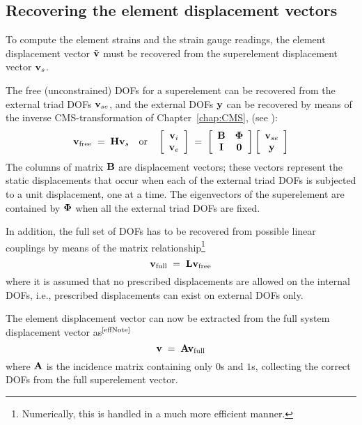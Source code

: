 \subsection{Recovering the element displacement vectors}

To compute the element strains and the strain gauge readings,
the element displacement vector $\tilde{\bf v}$ must be recovered from the
superelement displacement vector ${\bf v}_s$.

The free (unconstrained) DOFs for a superelement can be recovered from the
external triad DOFs ${\bf v}_{se}$, and the external DOFs ${\bf y}$ can be
recovered by means of the inverse CMS-transformation of Chapter~\ref{chap:CMS},
(see ):
%
\begin{equation}
{\bf v}_{\text{free}} \;=\; {\bf H v}_s \quad\text{or}\quad
\left[\begin{array}{c} {\bf v}_i \\ {\bf v}_e \end{array}\right] \;=\;
\left[\begin{array}{cc} {\bf B} & {\boldsymbol{\Phi}} \\ {\bf I} & {\bf 0}
\end{array}\right]
\left[\begin{array}{c} {\bf v}_{se} \\ {\bf y}
\end{array}\right]
\end{equation}
%
The columns of matrix $\bf B$ are displacement vectors; these vectors represent
the static displacements that occur when each of the external triad DOFs is
subjected to a unit displacement, one at a time.
The eigenvectors of the superelement are contained by $\boldsymbol{\Phi}$ when all the
external triad DOFs are fixed.

In addition, the full set of DOFs has to be recovered from possible linear
couplings by means of the matrix relationship\footnote{\label{effNote}
Numerically, this is handled in a much more efficient manner.}
%
\begin{equation}
{\bf v}_\text{full} \;=\; {\bf L v}_\text{free}
\end{equation}
%
where it is assumed that no prescribed displacements are allowed on the
internal DOFs, i.e., prescribed displacements can exist on external DOFs only.

The element displacement vector can now be extracted from the full system
displacement vector as$^\text{\ref{effNote}}$
%
\begin{equation}
{\bf v} \;=\; {\bf A v}_\text{full}
\end{equation}
%
where $\bf A$ is the incidence matrix containing only $0$s and $1$s,
collecting the correct DOFs from the full superelement vector.

